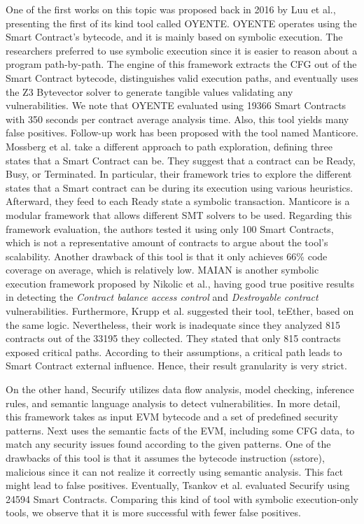 \documentclass[a4paper,11pt]{article}
\begin{document}
One of the first works on this topic was proposed back in 2016 by Luu et al.\cite{luu2016making},
presenting the first of its kind tool called OYENTE. OYENTE operates using the
Smart Contract's bytecode, and it is mainly based on symbolic execution. The
researchers preferred to use symbolic execution since it is easier to reason
about a program path-by-path. The engine of this framework extracts the CFG out
of the Smart Contract bytecode, distinguishes valid execution paths, and
eventually uses the Z3 Bytevector solver\cite{z3Solver} to generate tangible values
validating any vulnerabilities. We note that OYENTE evaluated using 19366 Smart
Contracts with 350 seconds per contract average analysis time. Also, this tool
yields many false positives. Follow-up work has been proposed with the tool
named Manticore\cite{mossberg2019manticore}. Mossberg et al. take a different approach to path
exploration, defining three states that a Smart Contract can be. They suggest
that a contract can be Ready, Busy, or Terminated. In particular, their
framework tries to explore the different states that a Smart contract can be
during its execution using various heuristics. Afterward, they feed to each
Ready state a symbolic transaction. Manticore is a modular framework that allows
different SMT solvers to be used. Regarding this framework evaluation, the
authors tested it using only 100 Smart Contracts, which is not a representative
amount of contracts to argue about the tool's scalability. Another drawback of
this tool is that it only achieves 66\% code coverage on average, which is
relatively low. MAIAN\cite{nikolic2018finding} is another symbolic execution framework proposed by
Nikolic et al., having good true positive results in detecting the \emph{Contract
balance access control} and \emph{Destroyable contract} vulnerabilities. Furthermore,
Krupp et al. suggested their tool, teEther\cite{krupp2018teether}, based on the same logic.
Nevertheless, their work is inadequate since they analyzed 815 contracts out of
the 33195 they collected. They stated that only 815 contracts exposed critical
paths. According to their assumptions, a critical path leads to Smart Contract
external influence. Hence, their result granularity is very strict.

On the other hand, Securify\cite{tsankov2018securify} utilizes data flow analysis, model checking,
inference rules, and semantic language analysis to detect vulnerabilities. In
more detail, this framework takes as input EVM bytecode and a set of predefined
security patterns. Next uses the semantic facts of the EVM, including some CFG
data, to match any security issues found according to the given patterns. One of
the drawbacks of this tool is that it assumes the bytecode instruction (sstore),
malicious since it can not realize it correctly using semantic analysis. This
fact might lead to false positives. Eventually, Tsankov et al. evaluated
Securify using 24594 Smart Contracts. Comparing this kind of tool with symbolic
execution-only tools, we observe that it is more successful with fewer false
positives.
\end{document}
